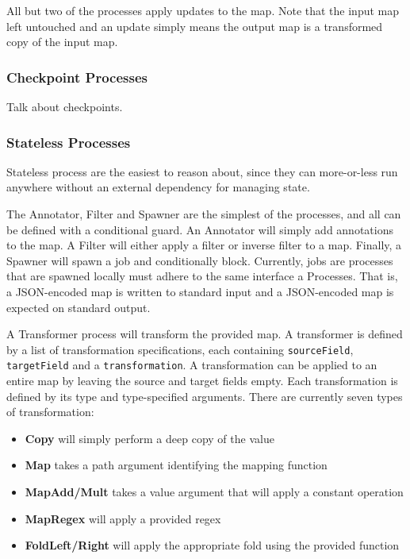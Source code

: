 \documentclass[10pt,twocolumn]{article}
\def\code#1{\texttt{#1}}
\begin{document}
All but two of the processes apply updates to the map.  Note that the input map
left untouched and an update simply means the output map is a transformed copy
of the input map.

\subsubsection{Checkpoint Processes}

Talk about checkpoints.

\subsubsection{Stateless Processes}

Stateless process are the easiest to reason about, since they can more-or-less
run anywhere without an external dependency for managing state.

The Annotator, Filter and Spawner are the simplest of the processes, and all
can be defined with a conditional guard.  An Annotator will simply add
annotations to the map.  A Filter will either apply a filter or inverse filter
to a map.  Finally, a Spawner will spawn a job and conditionally block.
Currently, jobs are processes that are spawned locally must adhere to the same
interface a Processes.  That is, a JSON-encoded map is written to standard
input and a JSON-encoded map is expected on standard output.

A Transformer process will transform the provided map.  A transformer is
defined by a list of transformation specifications, each containing
\code{sourceField}, \code{targetField} and a \code{transformation}.  A transformation can be
applied to an entire map by leaving the source and target fields empty.  Each
transformation is defined by its type and type-specified arguments.  There are
currently seven types of transformation:

\begin{itemize}
\item[]{\bfseries Copy} will simply perform a deep copy of the value
\item[]{\bfseries Map} takes a path argument identifying the mapping function
\item[]{\bfseries MapAdd/Mult} takes a value argument that will apply a constant operation
\item[]{\bfseries MapRegex} will apply a provided regex
\item[]{\bfseries FoldLeft/Right} will apply the appropriate fold using the provided function
\end{itemize}
\end{document}
